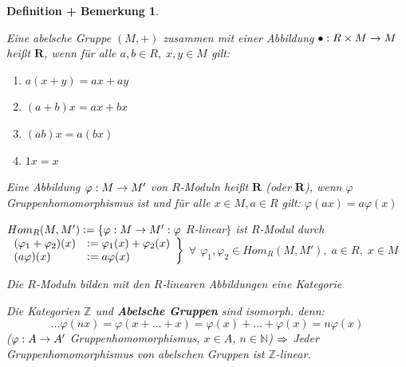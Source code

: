 \documentclass[a4paper,10pt,german]{scrbook}
\theoremstyle{saetze}
\theoremstyle{definitionen}
\newtheorem{DefBem}[Def]{Definition + Bemerkung}
\begin{document}
\begin{DefBem}
\begin{enum}
\item Eine abelsche Gruppe $(M,+)$ zusammen mit einer Abbildung
$\bullet: R \times M \rightarrow M$ heißt $\mathbf{R}$, wenn für
alle $a,b \in R,\; x,y\in M$ gilt:
\begin{enumerate}
\item[(i)] $a(x+y) = ax + ay$
\item[(ii)] $(a+b)x = ax + bx$
\item[(iii)] $(ab)x = a(bx)$
\item[(iv)] $ 1x = x$
\end{enumerate}

\item Eine Abbildung $\varphi: M \rightarrow M'$ von $R$-Moduln heißt
$\mathbf{R}$ (oder
$\mathbf{R}$), wenn $\varphi$ Gruppenhomomorphismus ist
und für alle $x \in M, a \in R$ gilt: $\varphi(ax) = a \varphi(x)$

\item $Hom_R(M,M') \mathrel{\mathop:}= \{ \varphi: M \rightarrow M' : \varphi$
$R$-linear$\}$ ist $R$-Modul durch
\newline$\left.\begin{array}{ll}
(\varphi_1 + \varphi_2)(x) &\mathrel{\mathop:}= \varphi_1(x) + \varphi_2(x) \\
(a \varphi)(x) &\mathrel{\mathop:}= a \varphi(x) \end{array}\right\}$ $\forall$
$\varphi_1,\varphi_2 \in Hom_R(M,M'),\;a\in R,\; x \in M$

\item Die $R$-Moduln bilden mit den $R$-linearen Abbildungen eine
Kategorie

\item Die Kategorien $\mathbf{\mathbb{Z}}$ und \textbf{Abelsche
Gruppen} sind isomorph. denn: \[ \dots \varphi(nx) =
\varphi(x+\dots+x) = \varphi(x) + \dots + \varphi(x) = n
\varphi(x)\] ($\varphi: A \rightarrow A'$ Gruppenhomomorphismus, $x \in A$,
$n \in \mathbb{N}$) $\Rightarrow$ Jeder Gruppenhomomorphismus von abelschen
Gruppen ist $\mathbb{Z}$-linear.
\end{enum}
\end{DefBem}
\end{document}

